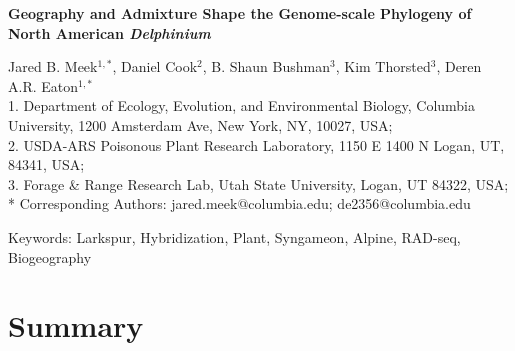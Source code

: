 \documentclass[11pt]{article}
\begin{document}
\begin{center}
	{\bf \Large
	Geography and Admixture Shape the Genome-scale Phylogeny of \\
	North American \emph{Delphinium}\\[0.5cm]
	}

Jared B. Meek$^{1,*}$, Daniel Cook$^2$, B. Shaun Bushman$^3$, Kim Thorsted$^3$, Deren A.R. Eaton$^{1,*}$\\[0.5cm]

1. Department of Ecology, Evolution, and Environmental Biology, Columbia University, 1200 Amsterdam Ave, New York, NY, 10027, USA;\\
2. USDA-ARS Poisonous Plant Research Laboratory, 1150 E 1400 N Logan, UT, 84341, USA;\\ 3. Forage \& Range Research Lab, Utah State University, Logan, UT 84322, USA;\\ 
* Corresponding Authors: jared.meek@columbia.edu; de2356@columbia.edu



\end{center}

Keywords: Larkspur, Hybridization, Plant, Syngameon, Alpine, RAD-seq, Biogeography

\RaggedRight

\section*{Summary}
\end{document}
